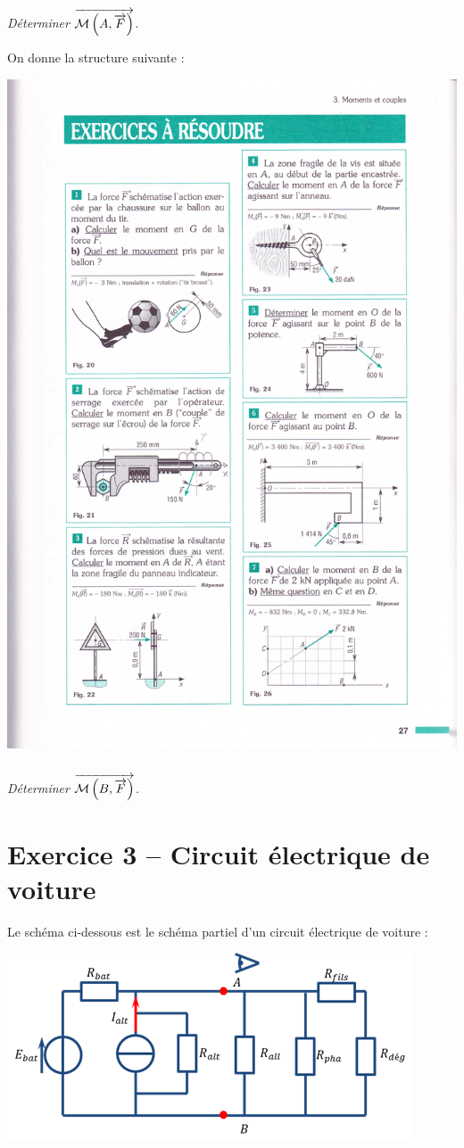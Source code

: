 \documentclass[10pt,fleqn]{book} %
\begin{document}
\begin{multicols}{2}
\subparagraph{}
\textit{Déterminer $\overrightarrow{\mathcal{M}\left(A,\overrightarrow{F} \right)}$.}

On donne la structure suivante : 
\begin{center}
\includegraphics[width=.6\linewidth]{images/fig_03}
\end{center}


\subparagraph{}
\textit{Déterminer $\overrightarrow{\mathcal{M}\left(B,\overrightarrow{F} \right)}$.}




\section*{Exercice 3 -- Circuit électrique de voiture}
\setcounter{subparagraph}{0}
Le schéma ci-dessous est le schéma partiel d'un circuit électrique de voiture :
\begin{center}
\includegraphics[width=.8\linewidth]{images/fig_04}
\end{center}


\end{multicols}
\end{document}
